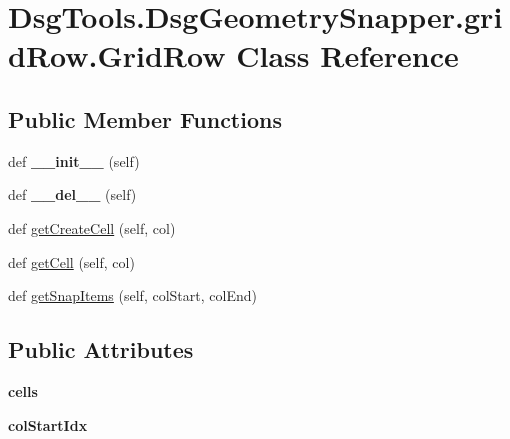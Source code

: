\hypertarget{class_dsg_tools_1_1_dsg_geometry_snapper_1_1grid_row_1_1_grid_row}{}\section{Dsg\+Tools.\+Dsg\+Geometry\+Snapper.\+grid\+Row.\+Grid\+Row Class Reference}
\label{class_dsg_tools_1_1_dsg_geometry_snapper_1_1grid_row_1_1_grid_row}
\subsection*{Public Member Functions}
\begin{DoxyCompactItemize}
\item 
\mbox{\label{class_dsg_tools_1_1_dsg_geometry_snapper_1_1grid_row_1_1_grid_row_a6cae7235e82b3675480d41f3ab5abcc4}} 
def {\bfseries \+\_\+\+\_\+init\+\_\+\+\_\+} (self)
\item 
\mbox{\label{class_dsg_tools_1_1_dsg_geometry_snapper_1_1grid_row_1_1_grid_row_aaef667ba4295107699398e7012ac3b6f}} 
def {\bfseries \+\_\+\+\_\+del\+\_\+\+\_\+} (self)
\item 
def \mbox{\hyperlink{class_dsg_tools_1_1_dsg_geometry_snapper_1_1grid_row_1_1_grid_row_a089cdeed16d12f4ab57d56f2d3315dad}{get\+Create\+Cell}} (self, col)
\item 
def \mbox{\hyperlink{class_dsg_tools_1_1_dsg_geometry_snapper_1_1grid_row_1_1_grid_row_a49e4a63a03cc5d0e813e4017392b6f02}{get\+Cell}} (self, col)
\item 
def \mbox{\hyperlink{class_dsg_tools_1_1_dsg_geometry_snapper_1_1grid_row_1_1_grid_row_a7b4d350e82484115c560ac406bacd9c8}{get\+Snap\+Items}} (self, col\+Start, col\+End)
\end{DoxyCompactItemize}
\subsection*{Public Attributes}
\begin{DoxyCompactItemize}
\item 
\mbox{\label{class_dsg_tools_1_1_dsg_geometry_snapper_1_1grid_row_1_1_grid_row_a92912e74180d74879ccb2874fd840123}} 
{\bfseries cells}
\item 
\mbox{\label{class_dsg_tools_1_1_dsg_geometry_snapper_1_1grid_row_1_1_grid_row_a4d6db9962d3ca66ad6a13e1b54fcf264}} 
{\bfseries col\+Start\+Idx}
\end{DoxyCompactItemize}


